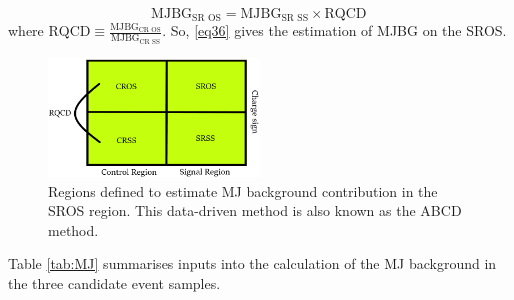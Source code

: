  \begin{equation}
\text{MJBG}_{\text{SR OS}}=\text{MJBG}_{\text{SR SS}}\times \text{RQCD}\,
\label{eq36}
\end{equation}
where $\text{RQCD}\equiv\frac{\text{MJBG}_{\text{CR OS}}}{\text{MJBG}_{\text{CR SS}}}$. So, \eqref{eq36} gives the estimation of MJBG on the SROS.
\begin{figure}[htbp]
	\centering
	\includegraphics[width=0.5\textwidth]{figures/Fig7.png}
	\caption{Regions defined to estimate MJ background contribution in the SROS region. This data-driven method is also known as the ABCD method.}
	\label{Fig7}
\end{figure}
Table \ref{tab:MJ} summarises inputs into the calculation of the MJ background in the three candidate event samples. 

